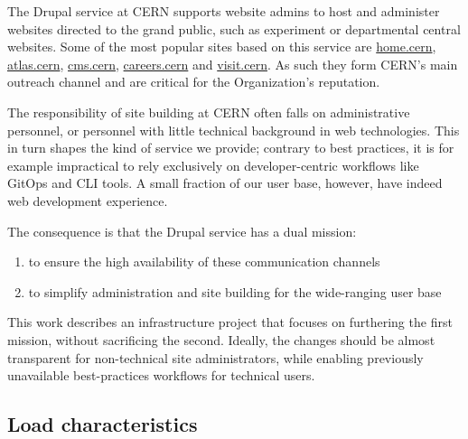 The Drupal service at CERN supports website admins to host and administer websites directed to the grand public,
such as experiment or departmental central websites.
Some of the most popular sites based on this service are \href{https://home.cern/}{home.cern}, \href{https://atlas.cern}{atlas.cern},
\href{https://cms.cern}{cms.cern}, \href{https://careers.cern}{careers.cern} and \href{https://visit.cern}{visit.cern}.
As such they form CERN's main outreach channel and are critical for the Organization's reputation.

The responsibility of site building at CERN often falls on administrative personnel, or personnel with little technical background in web technologies.
This in turn shapes the kind of service we provide; contrary to best practices, it is for example impractical to rely exclusively on developer-centric workflows like GitOps and CLI tools.
A small fraction of our user base, however, have indeed web development experience.

The consequence is that the Drupal service has a dual mission:
\begin{enumerate}
\item to ensure the high availability of these communication channels
\item to simplify administration and site building for the wide-ranging user base
\end{enumerate}

This work describes an infrastructure project that focuses on furthering the first mission, without sacrificing the second.
Ideally, the changes should be almost transparent for non-technical site administrators, while enabling previously unavailable best-practices workflows for technical users.


\subsection{Load characteristics}

